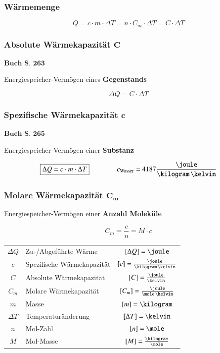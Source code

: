 \subsubsection{Wärmemenge}

$$ \boxed{ Q = c \cdot m \cdot \Delta T = n \cdot C_m \cdot \Delta T = C \cdot \Delta T } $$

\subsubsection{Absolute Wärmekapazität $\bm{C}$}
\begin{flushright}
	$\boxed{\textbf{Buch S. 263}}$
\end{flushright}

Energiespeicher-Vermögen eines \textbf{Gegenstands}

$$ \boxed{ \Delta Q = C \cdot \Delta T } $$


\subsubsection{Spezifische Wärmekapazität $\bm{c}$}
\begin{flushright}
	$\boxed{\textbf{Buch S. 265}}$
\end{flushright}


Energiespeicher-Vermögen einer \textbf{Substanz}

$$ \boxed{ \Delta Q = c \cdot m \cdot \Delta T } \qquad \qquad c_{\rm Wasser} = 4187 \frac{\joule}{\kilogram \, \kelvin} $$


\subsubsection{Molare Wärmekapazität $\bm {C_m}$}

Energiespeicher-Vermögen einer \textbf{Anzahl Moleküle}

$$ \boxed{ C_m = \frac{c}{n} = M \cdot c } $$

\renewcommand{\arraystretch}{1.3}
\begin{tabular}{c l c}
	$\Delta Q$	& Zu-/Abgeführte Wärme 			& $[\Delta Q] = \joule$ 						\\
	$c$ 		& Spezifische Wärmekapazität 	& $[c] = \frac{\joule}{\kilogram \, \kelvin}$ 	\\
	$C$ 		& Absolute Wärmekapazität 		& $[C] = \frac{\joule}{\kelvin}$ 				\\
	$C_m$ 		& Molare Wärmekapazität 		& $[C_m] = \frac{\joule}{\mole \, \kelvin}$ 	\\
	$m$ 		& Masse 						& $[m] = \kilogram$ 							\\
	$\Delta T$ 	& Temperaturänderung 			& $[\Delta T] = \kelvin$ 						\\
	$n$ 		& Mol-Zahl 						& $[n] = \mole$ 								\\
	$M$ 		& Mol-Masse 					& $[M] = \frac{\kilogram}{\mole}$
\end{tabular}
\renewcommand{\arraystretch}{1}


